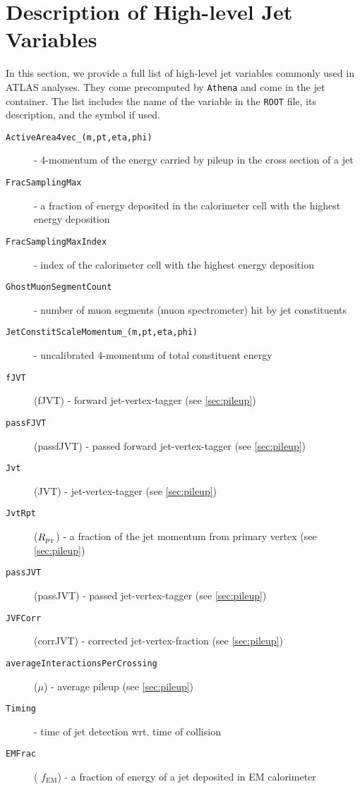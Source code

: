 \chapter{Description of High-level Jet Variables}
\label{ch:app_high_level_variables}
In this section, we provide a full list of high-level jet variables commonly used in ATLAS analyses. 
They come precomputed by \texttt{Athena} and come in the jet container. 
The list includes the name of the variable in the \texttt{ROOT} file, its description, and the symbol if used.
\begin{description}
    \item[\texttt{ActiveArea4vec\_(m,pt,eta,phi)}]  -  4-momentum of the energy carried by pileup in the cross section of a jet
    \item[\texttt{FracSamplingMax}]  -  a fraction of energy deposited in the calorimeter cell with the highest energy deposition
    \item[\texttt{FracSamplingMaxIndex}]  -  index of the calorimeter cell with the highest energy deposition 
    \item[\texttt{GhostMuonSegmentCount}]  -  number of muon segments (muon spectrometer) hit by jet constituents
    \item[\texttt{JetConstitScaleMomentum\_(m,pt,eta,phi)}]  -  uncalibrated 4-momentum of total constituent energy
    \item[\texttt{fJVT}]  (fJVT) -  forward jet-vertex-tagger (see \cref{sec:pileup})
    \item[\texttt{passFJVT}]  (passfJVT) -  passed forward jet-vertex-tagger (see \cref{sec:pileup})
    \item[\texttt{Jvt}]  (JVT) -  jet-vertex-tagger (see \cref{sec:pileup}) 
    \item[\texttt{JvtRpt}]  ($R_{p_\text{T}}$) - a fraction of the jet momentum from primary vertex (see \cref{sec:pileup})
    \item[\texttt{passJVT}]  (passJVT) -  passed jet-vertex-tagger (see \cref{sec:pileup})
    \item[\texttt{JVFCorr}]  (corrJVT) -  corrected jet-vertex-fraction (see \cref{sec:pileup}) 
    \item[\texttt{averageInteractionsPerCrossing}]  ($\mu$) -  average pileup (see \cref{sec:pileup})
    \item[\texttt{Timing}]  -  time of jet detection wrt. time of collision
    \item[\texttt{EMFrac}]  ( $f_{\text{EM}}$) -  a fraction of energy of a jet deposited in EM calorimeter 

\end{description}
